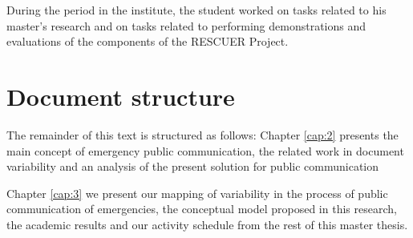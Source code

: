 During the period in the institute, the student worked on tasks related to his master's research and on tasks related to performing demonstrations and evaluations of the components of the RESCUER Project.

\section{Document structure}

The remainder of this text is structured as follows: Chapter \ref{cap:2} presents the main concept of emergency public communication, the related work in document variability and an analysis of the present solution for public communication

Chapter \ref{cap:3} we present our mapping of variability in the process of public communication of emergencies, the conceptual model proposed in this research, the academic results and our activity schedule from the rest of this master thesis.